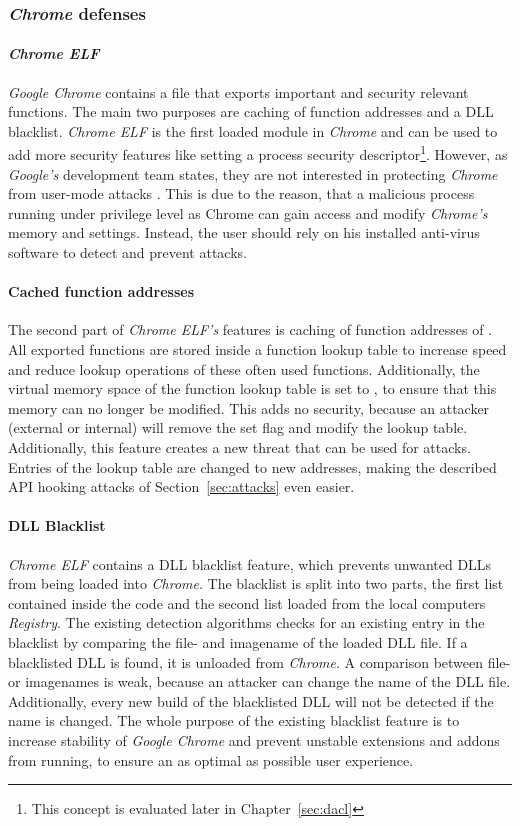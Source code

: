 \subsubsection{\emph{Chrome} defenses}
\paragraph{\emph{Chrome ELF}}
\emph{Google Chrome} contains a  file that exports important and security relevant functions. The main two purposes are caching of function addresses and a \gls{DLL} blacklist. \emph{Chrome ELF} is the first loaded module in \emph{Chrome} and can be used to add more security features like setting a process security descriptor\footnote{This concept is evaluated later in Chapter~\ref{sec:dacl}}. However, as \emph{Google's} development team states, they are not interested in protecting \emph{Chrome} from user-mode attacks \cite{chromium_security}. This is due to the reason, that a malicious process running under privilege level as Chrome can gain access and modify \emph{Chrome's} memory and settings. Instead, the user should rely on his installed anti-virus software to detect and prevent attacks.

\paragraph{Cached function addresses}
The second part of \emph{Chrome ELF's} features is caching of function addresses of . All exported functions are stored inside a function lookup table to increase speed and reduce lookup operations of these often used functions. Additionally, the virtual memory space of the function lookup table is set to , to ensure that this memory can no longer be modified. This adds no security, because an attacker (external or internal) will remove the set  flag and modify the lookup table. Additionally, this feature creates a new threat that can be used for attacks. Entries of the lookup table are changed to new addresses, making the described \gls{API} hooking attacks of Section~\ref{sec:attacks} even easier.

\paragraph{DLL Blacklist}
\emph{Chrome ELF} contains a \gls{DLL} blacklist feature, which prevents unwanted \glspl{DLL} from being loaded into \emph{Chrome}. The blacklist is split into two parts, the first list contained inside the code and the second list loaded from the local computers \emph{Registry}. The existing detection algorithms checks for an existing entry in the blacklist by comparing the file- and imagename of the loaded \gls{DLL} file. If a blacklisted \gls{DLL} is found, it is unloaded from \emph{Chrome}. A comparison between file- or imagenames is weak, because an attacker can change the name of the \gls{DLL} file. Additionally, every new build of the blacklisted \gls{DLL} will not be detected if the name is changed. The whole purpose of the existing blacklist feature is to increase stability of \emph{Google Chrome} and prevent unstable extensions and addons from running, to ensure an as optimal as possible user experience.